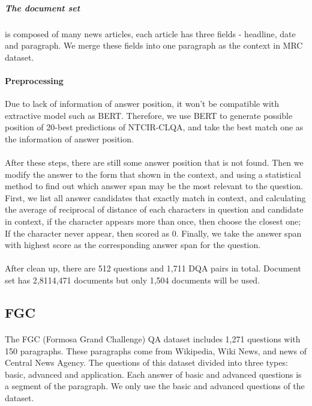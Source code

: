 \documentclass{article}
\begin{document}
\subparagraph{The document set} is composed of many news articles, each article has three fields - headline, date and paragraph. We merge these fields into one paragraph as the context in MRC dataset.

\paragraph{Preprocessing}
Due to lack of information of answer position, it won't be compatible with extractive model such as BERT. Therefore, we use BERT to generate possible position of 20-best predictions of NTCIR-CLQA, and take the best match one as the information of answer position.

\paragraph{}
After these steps, there are still some answer position that is not found. Then we modify the answer to the form that shown in the context, and using a statistical method to find out which answer span may be the most relevant to the question. First, we list all answer candidates that exactly match in context, and calculating the average of reciprocal of distance of each characters in question and candidate in context, if the character appears more than once, then choose the closest one; If the character never appear, then scored as 0. Finally, we take the answer span with highest score as the corresponding answer span for the question.

\paragraph{}
After clean up, there are 512 questions and 1,711 DQA pairs in total. Document set has 2,8114,471 documents but only 1,504 documents will be used.

\subsection{FGC}
\paragraph{}
The FGC (Formosa Grand Challenge) QA dataset includes 1,271 questions with 150 paragraphs. These paragraphs come from Wikipedia, Wiki News, and news of Central News Agency. The questions of this dataset divided into three types: basic, advanced and application. Each answer of basic and advanced questions is a segment of the paragraph. We only use the basic and advanced questions of the dataset.
\end{document}
